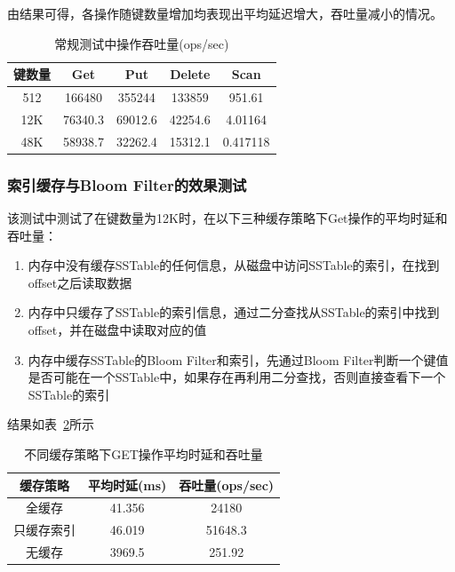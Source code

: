 \documentclass[fontset=windows]{article}
\begin{document}
由结果可得，各操作随键数量增加均表现出平均延迟增大，吞吐量减小的情况。

\begin{table}[ht]
    \centering
    \begin{tabular}{ccccc}
        \toprule
        \textbf{键数量} & \textbf{Get} & \textbf{Put} & \textbf{Delete} & \textbf{Scan} \\
        \midrule
        512 & 166480 & 355244 & 133859 & 951.61 \\
        12K & 76340.3 & 69012.6 & 42254.6 & 4.01164 \\
        48K & 58938.7 & 32262.4 & 15312.1 & 0.417118 \\
        \bottomrule
    \end{tabular}
    \caption{常规测试中操作吞吐量(ops/sec)}
    \label{tab:regular_throughput}
\end{table}

\subsubsection{索引缓存与Bloom Filter的效果测试}
该测试中测试了在键数量为12K时，在以下三种缓存策略下Get操作的平均时延和吞吐量：
\begin{enumerate}
    \item 内存中没有缓存SSTable的任何信息，从磁盘中访问SSTable的索引，在找到offset之后读取数据
    \item 内存中只缓存了SSTable的索引信息，通过二分查找从SSTable的索引中找到offset，并在磁盘中读取对应的值
    \item 内存中缓存SSTable的Bloom Filter和索引，先通过Bloom Filter判断一个键值是否可能在一个SSTable中，如果存在再利用二分查找，否则直接查看下一个SSTable的索引
\end{enumerate}
结果如表~\ref{tab:cache_test}所示

\begin{table}[ht]
    \centering
    \begin{tabular}{ccc}
        \toprule
        \textbf{缓存策略} & \textbf{平均时延(ms)} & \textbf{吞吐量(ops/sec)} \\
        \midrule
        全缓存 & 41.356 & 24180 \\
        只缓存索引 & 46.019 & 51648.3 \\
        无缓存 & 3969.5 & 251.92 \\
        \bottomrule
    \end{tabular}
    \caption{不同缓存策略下GET操作平均时延和吞吐量}
    \label{tab:cache_test}
\end{table}
\end{document}
